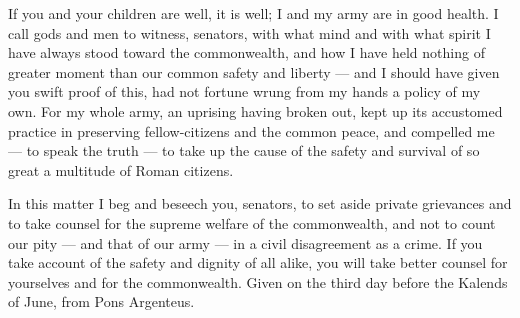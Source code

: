 

 If you and your children are well, it is well; I and my army are in good health. I call gods and men to witness, senators, with what mind and with what spirit I have always stood toward the commonwealth, and how I have held nothing of greater moment than our common safety and liberty --- and I should have given you swift proof of this, had not fortune wrung from my hands a policy of my own. For my whole army, an uprising having broken out, kept up its accustomed practice in preserving fellow-citizens and the common peace, and compelled me --- to speak the truth --- to take up the cause of the safety and survival of so great a multitude of Roman citizens.

 In this matter I beg and beseech you, senators, to set aside private grievances and to take counsel for the supreme welfare of the commonwealth, and not to count our pity --- and that of our army --- in a civil disagreement as a crime. If you take account of the safety and dignity of all alike, you will take better counsel for yourselves and for the commonwealth. Given on the third day before the Kalends of June, from Pons Argenteus.
